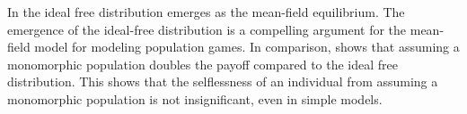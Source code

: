 In  the ideal free distribution emerges as the mean-field equilibrium. The emergence of the ideal-free distribution is a compelling argument for the mean-field model for modeling population games. In comparison,  shows that assuming a monomorphic population doubles the payoff compared to the ideal free distribution. This shows that the selflessness of an individual from assuming a monomorphic population is not insignificant, even in simple models.
